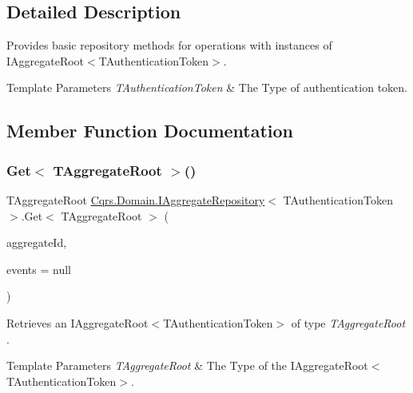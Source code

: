 \subsection{Detailed Description}
Provides basic repository methods for operations with instances of I\+Aggregate\+Root$<$\+T\+Authentication\+Token$>$. 


\begin{DoxyTemplParams}{Template Parameters}
{\em T\+Authentication\+Token} & The Type of authentication token.\\
\hline
\end{DoxyTemplParams}


\subsection{Member Function Documentation}
\mbox{\label{interfaceCqrs_1_1Domain_1_1IAggregateRepository_a890633fddbd05bd3b9e9968a2de095bb_a890633fddbd05bd3b9e9968a2de095bb}} 
\subsubsection{\texorpdfstring{Get$<$ T\+Aggregate\+Root $>$()}{Get< TAggregateRoot >()}}
{\footnotesize\ttfamily T\+Aggregate\+Root \hyperlink{interfaceCqrs_1_1Domain_1_1IAggregateRepository}{Cqrs.\+Domain.\+I\+Aggregate\+Repository}$<$ T\+Authentication\+Token $>$.Get$<$ T\+Aggregate\+Root $>$ (\begin{DoxyParamCaption}\item[{Guid}]{aggregate\+Id,  }\item[{I\+List$<$ \hyperlink{interfaceCqrs_1_1Events_1_1IEvent}{I\+Event}$<$ T\+Authentication\+Token $>$$>$}]{events = {\ttfamily null} }\end{DoxyParamCaption})}



Retrieves an I\+Aggregate\+Root$<$\+T\+Authentication\+Token$>$ of type {\itshape T\+Aggregate\+Root} . 


\begin{DoxyTemplParams}{Template Parameters}
{\em T\+Aggregate\+Root} & The Type of the I\+Aggregate\+Root$<$\+T\+Authentication\+Token$>$.\\
\hline
\end{DoxyTemplParams}

